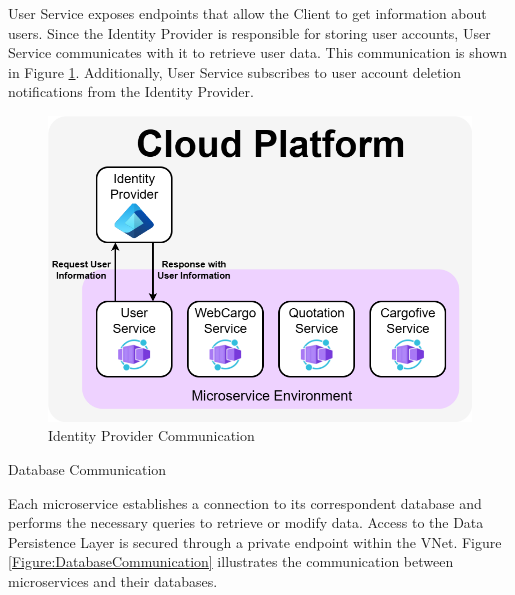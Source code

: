 \documentclass[12pt,reqno, oneside]{amsbook}
\makeatletter
\def\subsection{\@startsection{subsection}{2}%
      \z@{.5\linespacing\@plus.7\linespacing}{.25\linespacing}%
      {\normalfont\bfseries\flushleft}}
\theoremstyle{definition}
\theoremstyle{definition}
\numberwithin{section}{chapter}
\numberwithin{table}{chapter}
\numberwithin{figure}{chapter}
\makeatother
\begin{document}
User Service exposes endpoints that allow the Client to get information about users. Since the Identity Provider is responsible for storing user accounts, User Service communicates with it to retrieve user data. This communication is shown in Figure \ref{Figure:IdentityProviderCommunication}. Additionally, User Service subscribes to user account deletion notifications from the Identity Provider.

\begin{figure}[H]
  \centering
  \includegraphics[width=0.9\linewidth]{images/IdentityProviderCommunication.png}
  \caption{\label{Figure:IdentityProviderCommunication}Identity Provider Communication}
\end{figure}

\pagebreak

\subsection{Database Communication}

Each microservice establishes a connection to its correspondent database and performs the necessary queries to retrieve or modify data. Access to the Data Persistence Layer is secured through a private endpoint within the VNet. Figure \ref{Figure:DatabaseCommunication} illustrates the communication between microservices and their databases.
\end{document}
